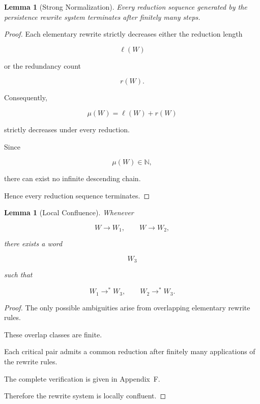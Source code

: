 \documentclass[11pt]{book}
\numberwithin{equation}{chapter}
\theoremstyle{definition}
\theoremstyle{plain}
\newtheorem{lemma}[definition]{Lemma}
\begin{document}
\begin{lemma}[Strong Normalization]

Every reduction sequence generated by the persistence rewrite system
terminates after finitely many steps.

\end{lemma}

\begin{proof}

Each elementary rewrite strictly decreases either the reduction length

\[
\ell(W)
\]

or the redundancy count

\[
r(W).
\]

Consequently,

\[
\mu(W)
=
\ell(W)+r(W)
\]

strictly decreases under every reduction.

Since

\[
\mu(W)\in\mathbb N,
\]

there can exist no infinite descending chain.

Hence every reduction sequence terminates.

\end{proof}

\begin{lemma}[Local Confluence]

Whenever

\[
W
\rightarrow
W_1,
\qquad
W
\rightarrow
W_2,
\]

there exists a word

\[
W_3
\]

such that

\[
W_1
\rightarrow^*
W_3,
\qquad
W_2
\rightarrow^*
W_3.
\]

\end{lemma}

\begin{proof}

The only possible ambiguities arise from overlapping elementary rewrite
rules.

These overlap classes are finite.

Each critical pair admits a common reduction after finitely many
applications of the rewrite rules.

The complete verification is given in Appendix~F.

Therefore the rewrite system is locally confluent.

\end{proof}
\end{document}
